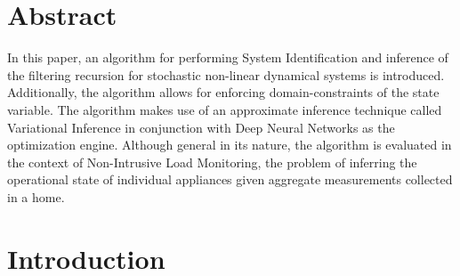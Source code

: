 
\section{Abstract}

In this paper, an algorithm for performing System Identification and inference of the filtering recursion for stochastic non-linear dynamical systems is introduced. Additionally, the algorithm allows for enforcing domain-constraints of the state variable. The algorithm makes use of an approximate inference technique called Variational Inference in conjunction with Deep Neural Networks as the optimization engine. Although general in its nature, the algorithm is evaluated in the context of Non-Intrusive Load Monitoring, the problem of inferring the operational state of individual appliances given aggregate measurements collected in a home.


\section{Introduction}
\label{sec:intro}

